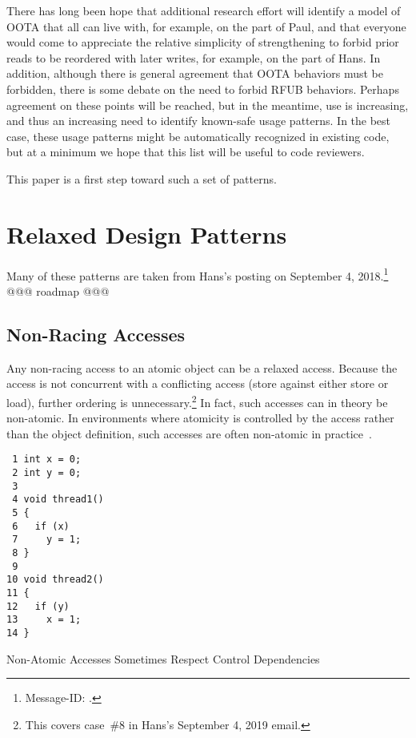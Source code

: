 \documentclass[10]{article}
\begin{document}
There has long been hope that additional research effort will identify
a model of OOTA that all can live with, for example, on the part of Paul,
and that everyone would come to appreciate the relative simplicity of
strengthening  to forbid prior reads to be
reordered with later writes, for example, on the part of Hans.
In addition, although there is general agreement that OOTA behaviors
must be forbidden, there is some debate on the need to forbid
RFUB behaviors.
Perhaps agreement on these points will be reached, but in the meantime,
 use is increasing, and thus an increasing need
to identify known-safe usage patterns.
In the best case, these usage patterns might be automatically recognized
in existing code, but at a minimum we hope that this list will be
useful to code reviewers.

This paper is a first step toward such a set of patterns.

\section{Relaxed Design Patterns}
\label{sec:Relaxed Design Patterns}

Many of these patterns are taken from Hans's 
posting on September 4, 2018.\footnote{
	Message-ID: .}
@@@ roadmap @@@

\subsection{Non-Racing Accesses}
\label{sec:Non-Racing Accesses}

Any non-racing access to an atomic object can be a relaxed access.
Because the access is not concurrent with a conflicting access (store
against either store or load), further ordering is unnecessary.\footnote{
	This covers case~\#8 in Hans's September 4, 2019 email.}
In fact, such accesses can in theory be non-atomic.
In environments where atomicity is controlled by the access rather
than the object definition, such accesses are often non-atomic in
practice~\cite{JadeAlglave2019WhoAfraidCompiler}.

\begin{listing}[tbp]
\begin{verbatim}
 1 int x = 0;
 2 int y = 0;
 3
 4 void thread1()
 5 {
 6   if (x)
 7     y = 1;
 8 }
 9
10 void thread2()
11 {
12   if (y)
13     x = 1;
14 }
\end{verbatim}
\caption{Non-Atomic Accesses Sometimes Respect Control Dependencies}
\label{lst:Non-Atomic Accesses Sometimes Respect Control Dependencies}
\end{listing}
\end{document}
